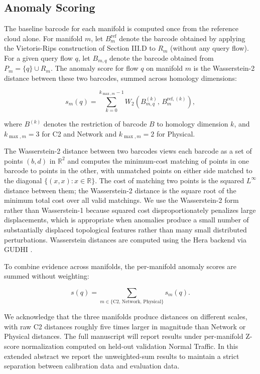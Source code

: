\documentclass[conf]{new-aiaa}
\begin{document}
\subsection{Anomaly Scoring}

The baseline barcode for each manifold is computed once from the reference cloud alone. For manifold $m$, let $B_m^{\text{ref}}$ denote the barcode obtained by applying the Vietoris-Rips construction of Section III.D to $R_m$ (without any query flow). For a given query flow $q$, let $B_{m,q}$ denote the barcode obtained from $P_m = \{q\} \cup R_m$. The anomaly score for flow $q$ on manifold $m$ is the Wasserstein-2 distance between these two barcodes, summed across homology dimensions:

\begin{equation}
s_m(q) = \sum_{k=0}^{k_{\max,m}-1} W_2\!\left( B_{m,q}^{(k)},\, B_m^{\text{ref},(k)} \right),
\label{eq:anomaly_score}
\end{equation}

where $B^{(k)}$ denotes the restriction of barcode $B$ to homology dimension $k$, and $k_{\max,m} = 3$ for C2 and Network and $k_{\max,m} = 2$ for Physical.

The Wasserstein-2 distance between two barcodes views each barcode as a set of points $(b, d)$ in $\mathbb{R}^2$ and computes the minimum-cost matching of points in one barcode to points in the other, with unmatched points on either side matched to the diagonal $\{(x, x) : x \in \mathbb{R}\}$. The cost of matching two points is the squared $L^\infty$ distance between them; the Wasserstein-2 distance is the square root of the minimum total cost over all valid matchings. We use the Wasserstein-2 form rather than Wasserstein-1 because squared cost disproportionately penalizes large displacements, which is appropriate when anomalies produce a small number of substantially displaced topological features rather than many small distributed perturbations. Wasserstein distances are computed using the Hera backend \cite{Kerber} via GUDHI \cite{Maria}.

To combine evidence across manifolds, the per-manifold anomaly scores are summed without weighting:

\begin{equation}
s(q) = \sum_{m \in \{ \text{C2, Network, Physical} \}} s_m(q).
\label{eq:combined_score}
\end{equation}

We acknowledge that the three manifolds produce distances on different scales, with raw C2 distances roughly five times larger in magnitude than Network or Physical distances. The full manuscript will report results under per-manifold Z-score normalization computed on held-out validation Normal Traffic. In this extended abstract we report the unweighted-sum results to maintain a strict separation between calibration data and evaluation data.
\end{document}
